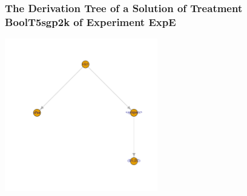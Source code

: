  \begin{frame}
 \frametitle{ The Derivation Tree of a Solution of Treatment BoolT5sgp2k of Experiment ExpE }
 \begin{center}
\includegraphics[width=0.5\textwidth, angle=0]
{ExpEDerivationTreeFigure005.pdf}
 \end{center}
 \label{report/ExpEDerivationTreeFigure005.pdf}  
 \end{frame}

